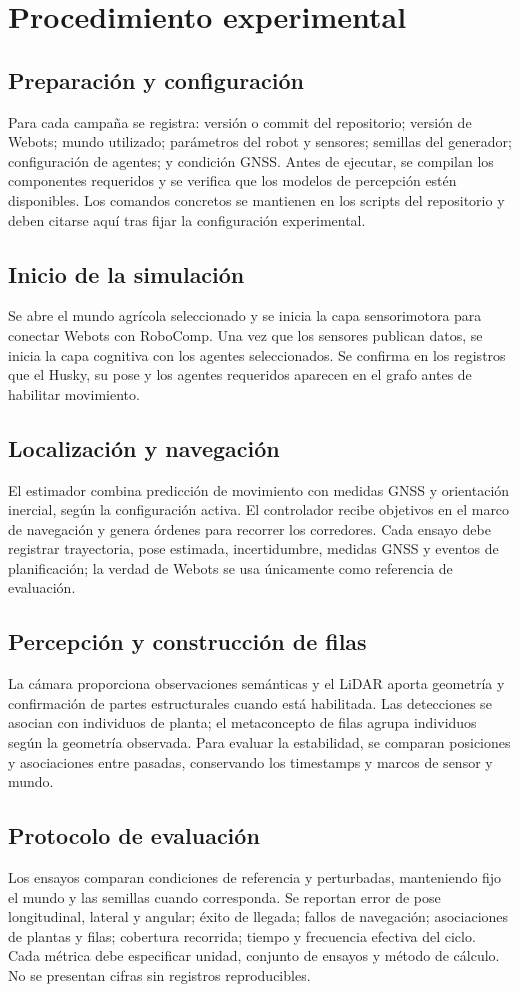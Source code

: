 \documentclass[12pt,a4paper]{article}
\begin{document}
\section{Procedimiento experimental}
\subsection{Preparación y configuración}
Para cada campaña se registra: versión o commit del repositorio; versión de Webots; mundo utilizado; parámetros del robot y sensores; semillas del generador; configuración de agentes; y condición GNSS. Antes de ejecutar, se compilan los componentes requeridos y se verifica que los modelos de percepción estén disponibles. Los comandos concretos se mantienen en los scripts del repositorio y deben citarse aquí tras fijar la configuración experimental.
\subsection{Inicio de la simulación}
Se abre el mundo agrícola seleccionado y se inicia la capa sensorimotora para conectar Webots con RoboComp. Una vez que los sensores publican datos, se inicia la capa cognitiva con los agentes seleccionados. Se confirma en los registros que el Husky, su pose y los agentes requeridos aparecen en el grafo antes de habilitar movimiento.
\subsection{Localización y navegación}
El estimador combina predicción de movimiento con medidas GNSS y orientación inercial, según la configuración activa. El controlador recibe objetivos en el marco de navegación y genera órdenes para recorrer los corredores. Cada ensayo debe registrar trayectoria, pose estimada, incertidumbre, medidas GNSS y eventos de planificación; la verdad de Webots se usa únicamente como referencia de evaluación.
\subsection{Percepción y construcción de filas}
La cámara proporciona observaciones semánticas y el LiDAR aporta geometría y confirmación de partes estructurales cuando está habilitada. Las detecciones se asocian con individuos de planta; el metaconcepto de filas agrupa individuos según la geometría observada. Para evaluar la estabilidad, se comparan posiciones y asociaciones entre pasadas, conservando los timestamps y marcos de sensor y mundo.
\subsection{Protocolo de evaluación}
Los ensayos comparan condiciones de referencia y perturbadas, manteniendo fijo el mundo y las semillas cuando corresponda. Se reportan error de pose longitudinal, lateral y angular; éxito de llegada; fallos de navegación; asociaciones de plantas y filas; cobertura recorrida; tiempo y frecuencia efectiva del ciclo. Cada métrica debe especificar unidad, conjunto de ensayos y método de cálculo. No se presentan cifras sin registros reproducibles.
\end{document}
